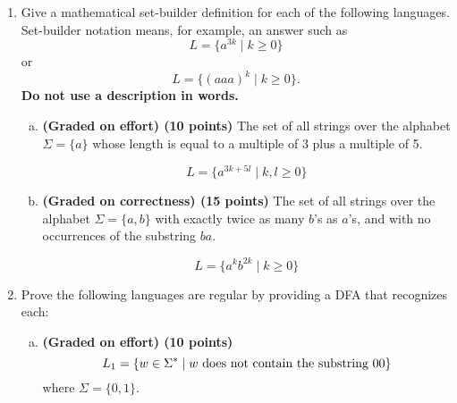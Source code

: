 \documentclass{article}
\theoremstyle{definition}
\newenvironment {solution}
{
\begin{tcolorbox}
}
{
\end{tcolorbox}
}
\begin{document}
\begin{enumerate}
    \item Give a mathematical set-builder definition for each of the following languages. Set-builder notation means, for example, an answer such as
    $$L = \{a^{3k} \mid k \geq 0\}$$
    or $$L = \{(aaa)^k \mid k \geq 0\}.$$
    \textbf{Do not use a description in words.} 
    \begin{enumerate}[(a)]
        \item \textbf{(Graded on effort) (10 points)} The set of all strings over the alphabet $\Sigma = \{a\}$ whose length is equal to a multiple of 3 plus a multiple of 5.
	      \begin{solution}
	      $$L = \{a^{3k + 5l} \mid k, l \geq 0\}$$
		\end{solution}
        \item \textbf{(Graded on correctness) (15 points)} The set of all strings over the alphabet $\Sigma = \{a, b\}$ with exactly twice as many $b$'s as $a$'s, and with no occurrences of the substring $ba$.        
	      \begin{solution}
	      $$L = \{a^k b^{2k} \mid k \geq 0\}$$
		\end{solution}
    \end{enumerate}

    \item Prove the following languages are regular by providing a DFA that recognizes each:
    \begin{enumerate}[(a)]
        \item \textbf{(Graded on effort) (10 points)} $$L_1 = \{w \in \Sigma^* \mid w \textnormal{ does not contain the substring }00 \}$$
    where $\Sigma = \{0, 1\}.$ 
	      \begin{solution}
\end{solution}
\end{enumerate}
\end{enumerate}
\end{document}
